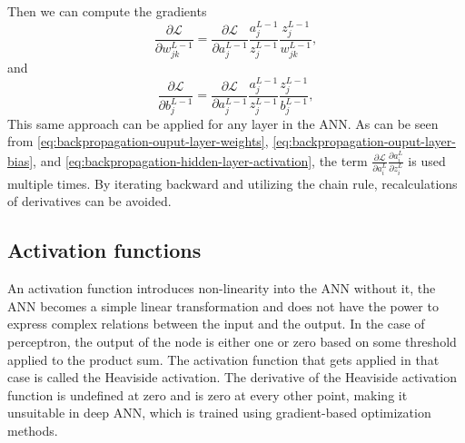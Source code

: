 Then we can compute the gradients
\begin{equation*}
    \frac{\partial \mathcal{L}}{\partial w_{jk}^{L-1}} = \frac{\partial \mathcal{L}}{\partial a_j^{L-1}} \frac{a_j^{L-1}}{z_j^{L-1}} \frac{z_j^{L-1}}{w_{jk}^{L-1}},
\end{equation*}
and
\begin{equation*}
    \frac{\partial \mathcal{L}}{\partial b_j^{L-1}} = \frac{\partial \mathcal{L}}{\partial a_j^{L-1}} \frac{a_j^{L-1}}{z_j^{L-1}} \frac{z_j^{L-1}}{b_j^{L-1}},
\end{equation*}
This same approach can be applied for any layer in the \gls{ANN}.
As can be seen from \autoref{eq:backpropagation-ouput-layer-weights}, \autoref{eq:backpropagation-ouput-layer-bias}, and \autoref{eq:backpropagation-hidden-layer-activation}, the term $\frac{\partial\mathcal{L}}{\partial a_i^L} \frac{\partial a_i^L}{\partial z_i^L}$ is used multiple times.
By iterating backward and utilizing the chain rule, recalculations of derivatives can be avoided.

\subsection{Activation functions}

An activation function introduces non-linearity into the \gls{ANN} without it, the \gls{ANN} becomes a simple linear transformation and does not have the power to express complex relations between the input and the output.
In the case of perceptron, the output of the node is either one or zero based on some threshold applied to the product sum.
The activation function that gets applied in that case is called the Heaviside activation.
The derivative of the Heaviside activation function is undefined at zero and is zero at every other point, making it unsuitable in deep \gls{ANN}, which is trained using gradient-based optimization methods.

